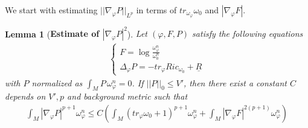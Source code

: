 \documentclass[11pt]{amsart}
\newtheorem{lem}{Lemma}[section]
\numberwithin{equation}{section}
\begin{document}
\noindent
We start with estimating $||\nabla_{\varphi}P||_{L^p}$ in terms of $tr_{\omega_{\varphi}}\omega_0$ and $|\nabla_{\varphi}F|$.\\


\begin{lem}[\textbf{Estimate of $|\nabla_\varphi P|^2$}]\label{Lem321}
	Let $(\varphi,F,P)$ satisfy the following equations 
	\begin{align}
		\begin{cases}
			F= \log \frac{\omega_\varphi^n}{\omega_0^n} \\
			\Delta_\varphi P=-tr_\varphi Ric_{\omega_0} +\underline R
		\end{cases}
	\end{align}
	with $P$ normalized as $\int_M P\,\omega_\varphi^n=0$. If $||P||_0\le V'$, then there exist a constant $C$ depends on $V', p$ and background metric such that 
	\begin{align}
		\int_M |\nabla_\varphi P |^{p+1}\omega_\varphi^n \le C\left( \int_M (tr_\varphi \omega_0 +1)^{p+1}\omega_\varphi^n + \int_M |\nabla_\varphi F|^{2(p+1)}\omega_\varphi^n \right)
	\end{align}\\
\end{lem}
\end{document}
